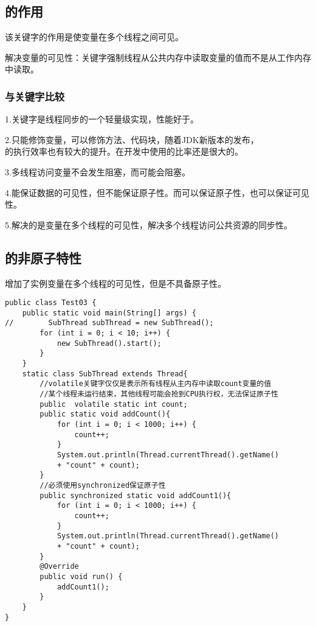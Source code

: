 \documentclass[a4paper]{report}
\begin{document}
\subsection{的作用}
该关键字的作用是使变量在多个线程之间可见。

解决变量的可见性：关键字强制线程从公共内存中读取变量的值而不是从工作内存中读取。
\subsubsection{与关键字比较}
1.关键字是线程同步的一个轻量级实现，性能好于。

2.只能修饰变量，可以修饰方法、代码块，随着JDK新版本的发布，\\ 的执行效率也有较大的提升。在开发中使用的比率还是很大的。

3.多线程访问变量不会发生阻塞，而可能会阻塞。

4.能保证数据的可见性，但不能保证原子性。而可以保证原子性，也可以保证可见性。

5.解决的是变量在多个线程的可见性，解决多个线程访问公共资源的同步性。
\subsection{的非原子特性}
增加了实例变量在多个线程的可见性，但是不具备原子性。
\begin{Verbatim}[frame=single,numbersep=5pt,xleftmargin=1.5em,xrightmargin=1.5em]
public class Test03 {
    public static void main(String[] args) {
//        SubThread subThread = new SubThread();
        for (int i = 0; i < 10; i++) {
            new SubThread().start();
        }
    }
    static class SubThread extends Thread{
        //volatile关键字仅仅是表示所有线程从主内存中读取count变量的值
        //某个线程未运行结束，其他线程可能会抢到CPU执行权，无法保证原子性
        public  volatile static int count;
        public static void addCount(){
            for (int i = 0; i < 1000; i++) {
                count++;
            }
            System.out.println(Thread.currentThread().getName()
            + "count" + count);
        }
        //必须使用synchronized保证原子性
        public synchronized static void addCount1(){
            for (int i = 0; i < 1000; i++) {
                count++;
            }
            System.out.println(Thread.currentThread().getName()
            + "count" + count);
        }
        @Override
        public void run() {
            addCount1();
        }
    }
}
\end{Verbatim}
\end{document}
